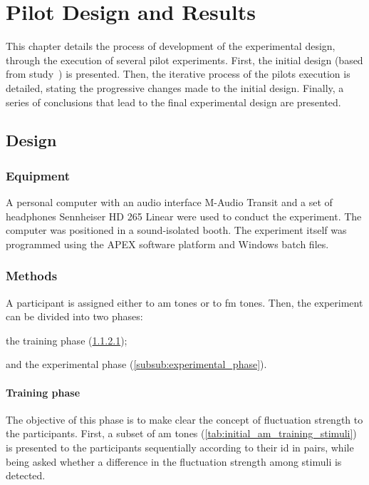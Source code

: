 \documentclass[../main.tex]{subfiles}
\begin{document}
\chapter{Pilot Design and Results}

This chapter details the process of development of the experimental design,
through the execution of several pilot experiments. First, the initial design
(based from \citeauthor{Fastl1982Fluctuation} study~\cite{Fastl1982Fluctuation})
is presented. Then, the iterative process of the pilots execution is detailed,
stating the progressive changes made to the initial design. Finally, a series of
conclusions that lead to the final experimental design are presented.

\section{Design}

\subsection{Equipment}

A personal computer with an audio interface M-Audio Transit and a set of
headphones Sennheiser HD 265 Linear were used to conduct the experiment. The
computer was positioned in a sound-isolated booth. The experiment itself was
programmed using the APEX software platform and Windows batch files.

\subsection{Methods}

A participant is assigned either to \gls{am} tones or to \gls{fm} tones. Then,
the experiment can be divided into two phases:
\begin{inparaenum}[(1)]
  \item the training phase (\ref{subsub:training_phase});
  \item and the experimental phase (\ref{subsub:experimental_phase}).
\end{inparaenum}

\subsubsection{Training phase}
\label{subsub:training_phase}

The objective of this phase is to make clear the concept of fluctuation strength
to the participants. First, a subset of \gls{am} tones
(\cref{tab:initial_am_training_stimuli}) is presented to the participants
sequentially according to their id in pairs, while being asked whether a
difference in the fluctuation strength among stimuli is detected.
\end{document}
